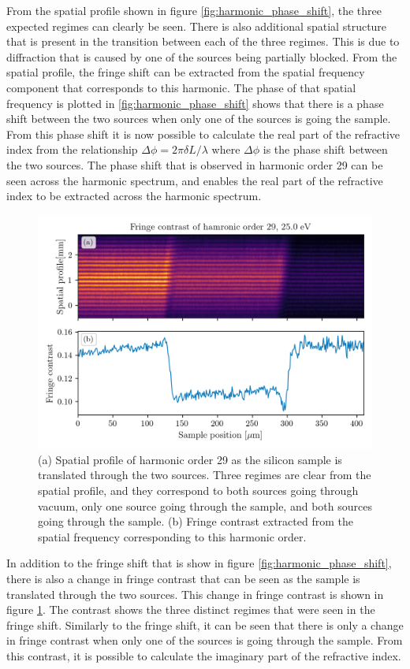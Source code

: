 From the spatial profile shown in figure \ref{fig:harmonic_phase_shift}, the three expected regimes can clearly be seen.  There is also additional spatial structure that is present in the transition between each of the three regimes.  This is due to diffraction that is caused by one of the sources being partially blocked.  From the spatial profile, the fringe shift can be extracted from the spatial frequency component that corresponds to this harmonic.  The phase of that spatial frequency is plotted in \ref{fig:harmonic_phase_shift} shows that there is a phase shift between the two sources when only one of the sources is going the sample.  From this phase shift it is now possible to calculate the real part of the refractive index from the relationship $\Delta \phi = 2\pi\delta L/\lambda$ where $\Delta \phi$ is the phase shift between the two sources.  The phase shift that is observed in harmonic order 29 can be seen across the harmonic spectrum, and enables the real part of the refractive index to be extracted across the harmonic spectrum.

\begin{figure}
	\centering
	\includegraphics[width=1.0\textwidth]{figures/refractive_index/spatialgram_fringe_contrast.png}
	\caption{(a) Spatial profile of harmonic order 29 as the silicon sample is translated through the two sources. Three regimes are clear from the spatial profile, and they correspond to both sources going through vacuum, only one source going through the sample, and both sources going through the sample. (b) Fringe contrast extracted from the spatial frequency corresponding to this harmonic order.}
	\label{fig:harmonic_fringe_contrast}
\end{figure}
In addition to the fringe shift that is show in figure \ref{fig:harmonic_phase_shift}, there is also a change in fringe contrast that can be seen as the sample is translated through the two sources.  This change in fringe contrast is shown in figure \ref{fig:harmonic_fringe_contrast}.  The contrast shows the three distinct regimes that were seen in the fringe shift.  Similarly to the fringe shift, it can be seen that there is only a change in fringe contrast when only one of the sources is going through the sample.  From this contrast, it is possible to calculate the imaginary part of the refractive index. 

